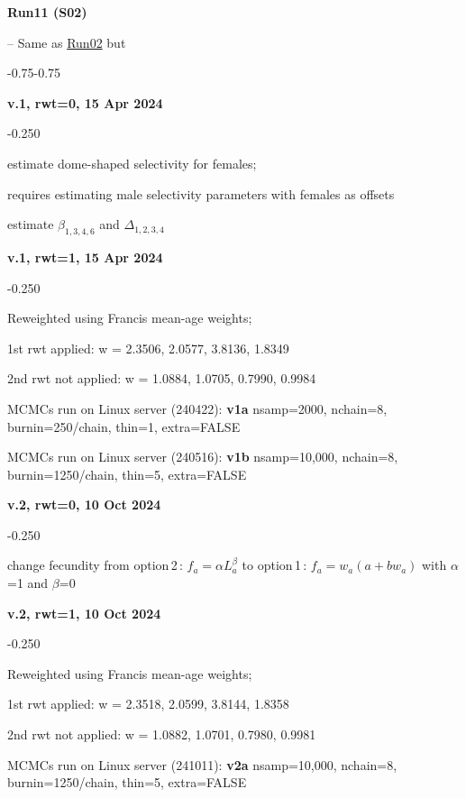 \hypertarget{R11}{\textbf{Run11 (S02)}} -- Same as \hyperlink{R02}{Run02} but
\begin{itemize_csas}{-0.75}{-0.75}
	\item \textbf{v.1, rwt=0, 15 Apr 2024}
	\begin{itemize_csas}{-0.25}{0}
		\item estimate dome-shaped selectivity for females;
		\item requires estimating male selectivity parameters with females as offsets
		\item estimate $\beta_{1,3,4,6}$ and $\Delta_{1,2,3,4}$
	\end{itemize_csas}
	\item \textbf{v.1, rwt=1, 15 Apr 2024}
	\begin{itemize_csas}{-0.25}{0}
		\item Reweighted using Francis mean-age weights;
		\item 1st rwt applied: w = 2.3506, 2.0577, 3.8136, 1.8349
		\item 2nd rwt not applied: w = 1.0884, 1.0705, 0.7990, 0.9984
		\item MCMCs run on Linux server (240422): \textbf{v1a} nsamp=2000, nchain=8, burnin=250/chain, thin=1, extra=FALSE
		\item MCMCs run on Linux server (240516): \textbf{v1b} nsamp=10,000, nchain=8, burnin=1250/chain, thin=5, extra=FALSE
	\end{itemize_csas}
	\item \textbf{v.2, rwt=0, 10 Oct 2024}
	\begin{itemize_csas}{-0.25}{0}
		\item change fecundity from option\,2\,: $f_a = \alpha L_a^{\beta}$ to option\,1\,:  $f_a = w_a (a + b w_a)$ with $\alpha$=1 and $\beta$=0
	\end{itemize_csas}
	\item \textbf{v.2, rwt=1, 10 Oct 2024}
	\begin{itemize_csas}{-0.25}{0}
		\item Reweighted using Francis mean-age weights;
		\item 1st rwt applied: w = 2.3518, 2.0599, 3.8144, 1.8358
		\item 2nd rwt not applied: w = 1.0882, 1.0701, 0.7980, 0.9981
		\item MCMCs run on Linux server (241011): \textbf{v2a} nsamp=10,000, nchain=8, burnin=1250/chain, thin=5, extra=FALSE
	\end{itemize_csas}
\end{itemize_csas}

